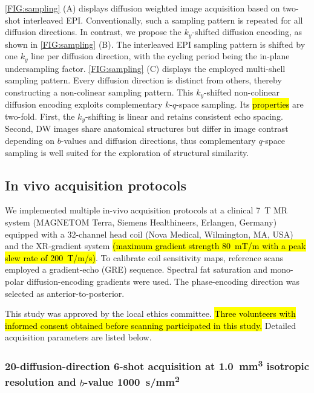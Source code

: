 \documentclass[preprint,12pt,authoryear,review]{elsarticle}
\begin{document}
    \cref{FIG:sampling} (A) displays diffusion weighted image acquisition
    based on two-shot interleaved EPI.
    Conventionally, such a sampling pattern is repeated for all diffusion directions.
    In contrast, we propose the $k_y$-shifted diffusion encoding,
    as shown in \cref{FIG:sampling} (B).
    The interleaved EPI sampling pattern is shifted by one $k_y$ line
    per diffusion direction,
    with the cycling period being the in-plane undersampling factor.
    \cref{FIG:sampling} (C) displays the employed multi-shell sampling pattern.
    Every diffusion direction is distinct from others,
    thereby constructing a non-colinear sampling pattern.
    This $k_y$-shifted non-colinear diffusion encoding exploits
    complementary $k$-$q$-space sampling.
    Its \hl{properties} are two-fold. 
    First, the $k_y$-shifting is linear and retains consistent echo spacing.
    Second, DW images share anatomical structures but differ in image contrast
    depending on $b$-values and diffusion directions,
    thus complementary $q$-space sampling is well suited
    for the exploration of structural similarity.

    \subsection{In vivo acquisition protocols}

    We implemented multiple in-vivo acquisition protocols
    at a clinical \SI{7}{\tesla} MR system
    (MAGNETOM Terra, Siemens Healthineers, Erlangen, Germany)
    equipped with a 32-channel head coil (Nova Medical, Wilmington, MA, USA)
    and the XR-gradient system
    \hl{(maximum gradient strength \mbox{\SI{80}{\milli\tesla / \meter}}
    with a peak slew rate of \mbox{\SI{200}{\tesla / \meter / \second}})}. 
    To calibrate coil sensitivity maps, reference scans employed a gradient-echo (GRE) sequence.
    Spectral fat saturation and mono-polar diffusion-encoding gradients were used.
    The phase-encoding direction was selected as anterior-to-posterior.

    This study was approved by the local ethics committee. 
    \hl{Three volunteers with informed consent obtained before scanning
    participated in this study.}
    Detailed acquisition parameters are listed below.

    \subsubsection{20-diffusion-direction 6-shot acquisition
    at \SI{1.0}{\cubic\milli\meter} isotropic resolution
    and $b$-value \SI{1000}{s/mm^2}}
    \label{SEC:ACQ_6shot}
\end{document}
